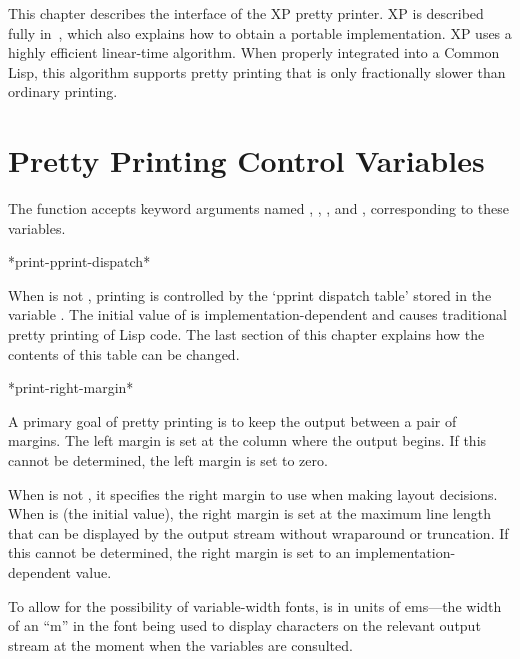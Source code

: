 \beforenoterule
\begin{implementation}
This chapter describes the interface of
the XP pretty printer.  XP is described fully
in~\cite{XP-PRETTY-PRINTER},
which also explains how to obtain a portable implementation.  XP uses
a highly efficient linear-time algorithm.  When properly integrated into a
Common Lisp, this algorithm supports pretty printing that is only
fractionally slower than ordinary printing.
\end{implementation}
\afternoterule

\section{Pretty Printing Control Variables}
\label{PPRINT-VARIABLES-SECTION}

The function  accepts keyword arguments named
, , , and ,
corresponding to these variables.

\begin{defun}[Variable]
*print-pprint-dispatch*

When  is not , printing is controlled by the `pprint
dispatch table' stored in the variable .  The
initial value of  is implementation-dependent and
causes traditional pretty printing of Lisp code.  The last section of this
chapter explains how the contents of this table can be changed.
\end{defun}

\begin{defun}[Variable]
*print-right-margin*

A primary goal of pretty printing is to keep the output between a pair of
margins.  The left margin is set at the column where the output begins.  If
this cannot be determined, the left margin is set to zero.

When  is not , it specifies the right
margin to use when making layout decisions.  When 
is  (the initial value), the right margin is set at the maximum
line length that can be displayed by the output stream without wraparound
or truncation.  If this cannot be determined, the right margin is set to an
implementation-dependent value.

To allow for the possibility of variable-width fonts,
 is in units of ems---the width of an
``m'' in the font being used to display characters on the relevant output
stream at the moment when the variables are consulted.
\end{defun}

